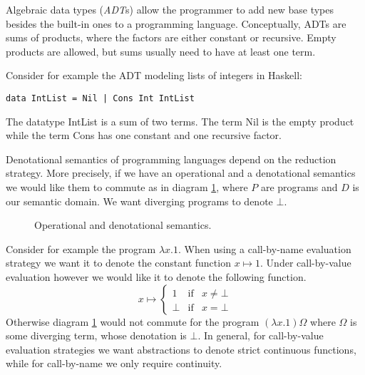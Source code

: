 \documentclass[a4paper]{article}
\begin{document}
Algebraic data types (\emph{ADT}s) allow the programmer to add new base types
besides the built-in ones to a programming language. Conceptually, ADTs are sums
of products, where the factors are either constant or recursive.  Empty products
are allowed, but sums usually need to have at least one term.

Consider for example the ADT modeling lists of integers in Haskell:

\begin{verbatim}
data IntList = Nil | Cons Int IntList
\end{verbatim}

The datatype IntList is a sum of two terms. The term Nil is the empty product
while the term Cons has one constant and one recursive factor.

Denotational semantics of programming languages depend on the reduction
strategy. More precisely, if we have an operational and a denotational semantics we would like
them to commute as in diagram \ref{figOperateDenoteSemantics}, where $P$ are
programs and $D$ is our semantic domain. We want diverging programs to denote $\bot$.

\begin{figure}[ht]
\begin{center}
\end{center}
\caption{Operational and denotational semantics.}
\label{figOperateDenoteSemantics}
\end{figure}

Consider for example the program $\lambda x . 1$. When using a call-by-name evaluation
strategy we want it to denote the constant function $x \mapsto 1$. Under
call-by-value
evaluation however we would like it to denote the following function.
\begin{equation*}
x \mapsto \left\{
  \begin{array}{lcl}
   1     & \text{if} & x \neq \bot \\
   \bot  & \text{if} & x = \bot
  \end{array}
\right.
\end{equation*}
Otherwise diagram \ref{figOperateDenoteSemantics} would not commute
for the program $(\lambda x . 1)\Omega$ where $\Omega$ is some diverging
term, whose denotation is $\bot$. In general, for call-by-value evaluation
strategies we want abstractions to denote strict continuous functions, while for
call-by-name we only require continuity.
\end{document}

